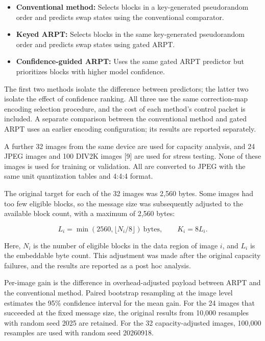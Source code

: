 \documentclass[
  11pt,
  a4paper,
]{article}
\providecommand{\tightlist}{%
  \setlength{\itemsep}{0pt}\setlength{\parskip}{0pt}}
\begin{document}
\begin{itemize}
\tightlist
\item
  \textbf{Conventional method:} Selects blocks in a key-generated
  pseudorandom order and predicts swap states using the conventional
  comparator.
\item
  \textbf{Keyed ARPT:} Selects blocks in the same key-generated
  pseudorandom order and predicts swap states using gated ARPT.
\item
  \textbf{Confidence-guided ARPT:} Uses the same gated ARPT predictor
  but prioritizes blocks with higher model confidence.
\end{itemize}

The first two methods isolate the difference between predictors; the
latter two isolate the effect of confidence ranking. All three use the
same correction-map encoding selection procedure, and the cost of each
method's control packet is included. A separate comparison between the
conventional method and gated ARPT uses an earlier encoding
configuration; its results are reported separately.

A further 32 images from the same device are used for capacity analysis,
and 24 JPEG images and 100 DIV2K images {[}9{]} are used for stress
testing. None of these images is used for training or validation. All
are converted to JPEG with the same unit quantization tables and 4:4:4
format.

The original target for each of the 32 images was 2,560 bytes. Some
images had too few eligible blocks, so the message size was subsequently
adjusted to the available block count, with a maximum of 2,560 bytes:

\[
L_i = \min(2560, \lfloor N_i/8\rfloor)\ \text{bytes}, \qquad K_i = 8L_i. \tag{14}
\]

Here, \(N_i\) is the number of eligible blocks in the data region of
image \(i\), and \(L_i\) is the embeddable byte count. This adjustment
was made after the original capacity failures, and the results are
reported as a post hoc analysis.

Per-image gain is the difference in overhead-adjusted payload between
ARPT and the conventional method. Paired bootstrap resampling at the
image level estimates the 95\% confidence interval for the mean gain.
For the 24 images that succeeded at the fixed message size, the original
results from 10,000 resamples with random seed 2025 are retained. For
the 32 capacity-adjusted images, 100,000 resamples are used with random
seed 20260918.
\end{document}
